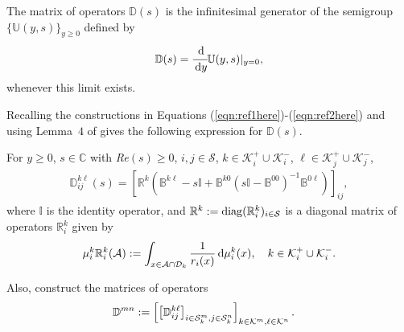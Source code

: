 The matrix of operators \(\mathbb D(s)\) is the infinitesimal generator of the semigroup \(\{\mathbb U(y,s)\}_{y\geq 0}\) defined by 
\[\mathbb D(s) = \cfrac{\, \mathrm{d}}{\, \mathrm{d} y}\mathbb U(y,s)|_{y=0},\]
whenever this limit exists.
			
	Recalling the constructions in Equations (\ref{eqn:ref1here})-(\ref{eqn:ref2here}) and using Lemma~$4$ of \citep{bo2014} gives the following expression for $\mathbb{D}(s)$. 
\begin{lem}\label{lemma: D(s)}
	For $y \geq 0$, $s \in \mathbb{C}$ with \textit{Re}$(s) \geq 0$, $i,j \in \mathcal{S}$, $k\in \mathcal K_i^+\cup\mathcal K_i^-$, $\ell\in \mathcal K_j^+\cup\mathcal K_j^-$,
	\begin{align*}
		\mathbb{D}_{ij}^{k\ell}(s) = [\mathbb{R}^{k}(
		\mathbb{B}^{k\ell } - s\mathbb{I} + \mathbb{B}^{k0 }(s \mathbb{I} - \mathbb{B}^{00})^{-1}\mathbb{B}^{0\ell})]_{ij}, 
	\end{align*} 
	where $\mathbb I$ is the identity operator, and $\mathbb{R}^{k} := \mathrm{diag}(\mathbb{R}_i^{k})_{i \in \mathcal{S}}$ is a diagonal matrix of operators $\mathbb{R}_i^{k}$ given by 
	\begin{align*} 
		{\mu}_i^{k}\mathbb{R}_i^{k}(\mathcal{A}) := \int_{x \in \mathcal{A} \cap \mathcal{D}_k} \frac{1}{r_i(x)}\, \mathrm{d}  \mu_i^{k}(x),\quad k\in \mathcal K_i^+\cup\mathcal K_i^-.
	\end{align*} 
\end{lem}

	Also, construct the matrices of operators 
	\begin{align*}
		\mathbb D^{m n} &:= \left[\left[\mathbb D_{ij}^{k \ell}\right]_{i\in\mathcal{S}_k^m,j\in\mathcal{S}_k^n}\right]_{k\in\mathcal K^m,\ell\in\mathcal K^n}.
        \end{align*}

